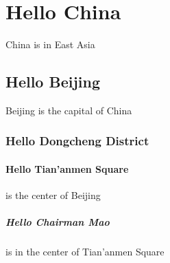 \documentclass{article}
\begin{document}
    \tableofcontents
    \section{Hello China} China is in East Asia
    \subsection{Hello Beijing} Beijing is the capital of China
    \subsubsection{Hello Dongcheng District}
    \paragraph{Hello Tian'anmen Square} is the center of Beijing
    \subparagraph{Hello Chairman Mao} is in the center of Tian'anmen Square
\end{document}
